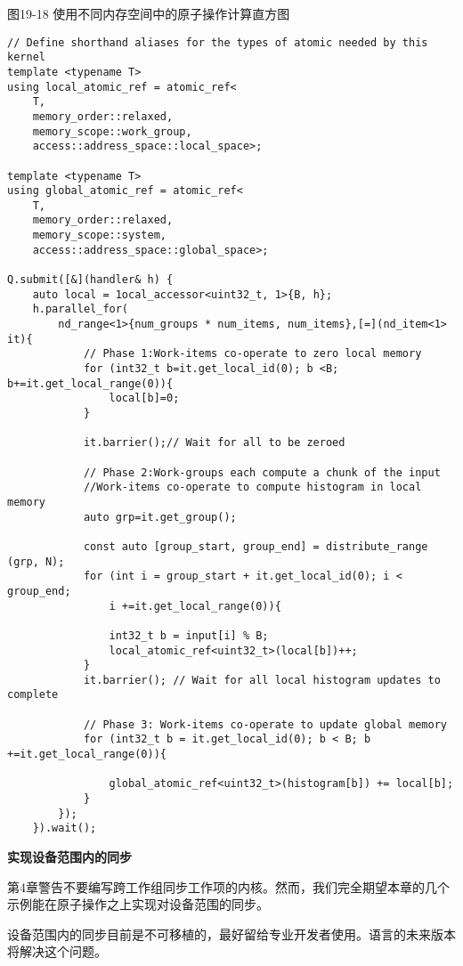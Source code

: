 \hspace*{\fill} \par %
图19-18 使用不同内存空间中的原子操作计算直方图
\begin{lstlisting}[caption={}]
// Define shorthand aliases for the types of atomic needed by this kernel 
template <typename T>
using local_atomic_ref = atomic_ref<
	T,
	memory_order::relaxed, 
	memory_scope::work_group,
	access::address_space::local_space>; 
	
template <typename T>
using global_atomic_ref = atomic_ref<
	T,
	memory_order::relaxed, 
	memory_scope::system,
	access::address_space::global_space>; 
	
Q.submit([&](handler& h) {
	auto local = 1ocal_accessor<uint32_t, 1>{B, h};
	h.parallel_for(
		nd_range<1>{num_groups * num_items, num_items},[=](nd_item<1> it){ 
			// Phase 1:Work-items co-operate to zero local memory
			for (int32_t b=it.get_local_id(0); b <B; b+=it.get_local_range(0)){
				local[b]=0;
			}
		
			it.barrier();// Wait for all to be zeroed
		
			// Phase 2:Work-groups each compute a chunk of the input 
			//Work-items co-operate to compute histogram in local memory 
			auto grp=it.get_group();
		
			const auto [group_start, group_end] = distribute_range (grp, N); 
			for (int i = group_start + it.get_local_id(0); i < group_end; 
				i +=it.get_local_range(0)){
			
				int32_t b = input[i] % B;
				local_atomic_ref<uint32_t>(local[b])++;
			}
			it.barrier(); // Wait for all local histogram updates to complete 
			
			// Phase 3: Work-items co-operate to update global memory
			for (int32_t b = it.get_local_id(0); b < B; b +=it.get_local_range(0)){
				
				global_atomic_ref<uint32_t>(histogram[b]) += local[b];
			}
		});
	}).wait();
\end{lstlisting}

\hspace*{\fill} \par %
\textbf{实现设备范围内的同步}

第4章警告不要编写跨工作组同步工作项的内核。然而，我们完全期望本章的几个示例能在原子操作之上实现对设备范围的同步。\par

\begin{tcolorbox}[colback=red!5!white,colframe=red!75!black]
设备范围内的同步目前是不可移植的，最好留给专业开发者使用。语言的未来版本将解决这个问题。
\end{tcolorbox}

